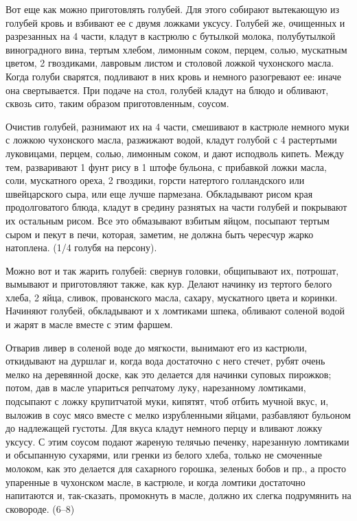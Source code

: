 Вот еще как можно приготовлять голубей. Для этого собирают вытекающую из голубей кровь и взбивают ее с двумя ложками уксусу. Голубей же, очищенных и разрезанных на 4 части, кладут в кастрюлю с бутылкой молока, полубутылкой виноградного вина, тертым хлебом, лимонным соком, перцем, солью, мускатным цветом, 2 гвоздиками, лавровым листом и столовой ложкой чухонского масла. Когда голуби сварятся, подливают в них кровь и немного разогревают ее: иначе она свертывается. При подаче на стол, голубей кладут на блюдо и обливают, сквозь сито, таким образом приготовленным, соусом. 


Очистив голубей, разнимают их на 4 части, смешивают в кастрюле немного муки с ложкою чухонского масла, разжижают водой, кладут голубой с 4 растертыми луковицами, перцем, солью, лимонным соком, и дают исподволь кипеть. Между тем, разваривают 1 фунт рису в 1 штофе бульона, с прибавкой ложки масла, соли, мускатного ореха, 2 гвоздики, горсти натертого голландского или швейцарского сыра, или еще лучше пармезана. Обкладывают рисом края продолговатого блюда, кладут в средину разнятых на части голубей и покрывают их остальным рисом. Все это обмазывают взбитым яйцом, посыпают тертым сыром и пекут в печи, которая, заметим, не должна быть чересчур жарко натоплена. (1/4 голубя на персону). 


Можно вот и так жарить голубей: свернув головки, общипывают их, потрошат, вымывают и приготовляют также, как кур. Делают начинку из тертого белого хлеба, 2 яйца, сливок, прованского масла, сахару, мускатного цвета и коринки. Начиняют голубей, обкладывают и х ломтиками шпека, обливают соленой водой и жарят в масле вместе с этим фаршем. 


Отварив ливер в соленой воде до мягкости, вынимают его из кастрюли, откидывают на дуршлаг и, когда вода достаточно с него стечет, рубят очень мелко на деревянной доске, как это делается для начинки суповых пирожков; потом, дав в масле упариться репчатому луку, нарезанному ломтиками, подсыпают с ложку крупитчатой муки, кипятят, чтоб отбить мучной вкус, и, выложив в соус мясо вместе с мелко изрубленными яйцами, разбавляют бульоном до надлежащей густоты. Для вкуса кладут немного перцу и вливают ложку уксусу. С этим соусом подают жареную телячью печенку, нарезанную ломтиками и обсыпанную сухарями, или гренки из белого хлеба, только не смоченные молоком, как это делается для сахарного горошка, зеленых бобов и пр., а просто упаренные в чухонском масле, в кастрюле, и когда ломтики достаточно напитаются и, так-сказать, промокнуть в масле, должно их слегка подрумянить на сковороде. (6--8) 

